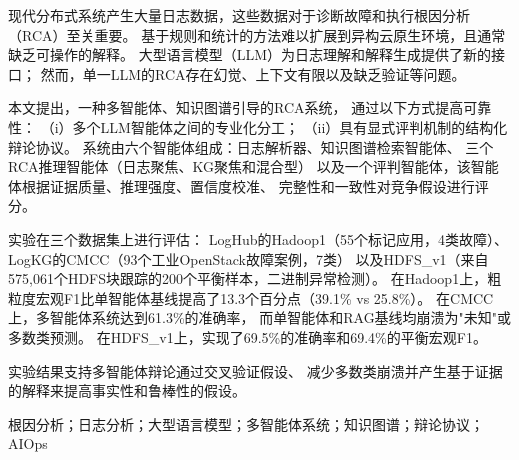 
\begin{zhaiyao}

现代分布式系统产生大量日志数据，这些数据对于诊断故障和执行根因分析（RCA）至关重要。
基于规则和统计的方法难以扩展到异构云原生环境，且通常缺乏可操作的解释。
大型语言模型（LLM）为日志理解和解释生成提供了新的接口；
然而，单一LLM的RCA存在幻觉、上下文有限以及缺乏验证等问题。

本文提出\systemname{}，一种多智能体、知识图谱引导的RCA系统，
通过以下方式提高可靠性：
（i）多个LLM智能体之间的专业化分工；
（ii）具有显式评判机制的结构化辩论协议。
系统由六个智能体组成：日志解析器、知识图谱检索智能体、
三个RCA推理智能体（日志聚焦、KG聚焦和混合型）
以及一个评判智能体，该智能体根据证据质量、推理强度、置信度校准、
完整性和一致性对竞争假设进行评分。

实验在三个数据集上进行评估：
LogHub的Hadoop1（55个标记应用，4类故障）、
LogKG的CMCC（93个工业OpenStack故障案例，7类）
以及HDFS\_v1（来自575,061个HDFS块跟踪的200个平衡样本，二进制异常检测）。
在Hadoop1上，\systemname{}粗粒度宏观F1比单智能体基线提高了13.3个百分点（39.1\% vs 25.8\%）。
在CMCC上，多智能体系统达到61.3\%的准确率，
而单智能体和RAG基线均崩溃为"未知"或多数类预测。
在HDFS\_v1上，\systemname{}实现了69.5\%的准确率和69.4\%的平衡宏观F1。

实验结果支持多智能体辩论通过交叉验证假设、
减少多数类崩溃并产生基于证据的解释来提高事实性和鲁棒性的假设。

\end{zhaiyao}

\begin{guanjianci}
根因分析；日志分析；大型语言模型；多智能体系统；知识图谱；辩论协议；AIOps
\end{guanjianci}


